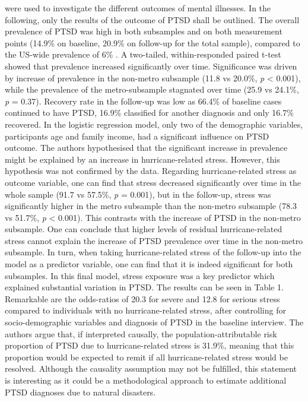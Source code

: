 \documentclass[
]{krantz}
\begin{document}
were used to investigate the different outcomes of mental illnesses. In the following, only the results of the outcome of PTSD shall be outlined.
The overall prevalence of PTSD was high in both subsamples and on both measurement points (14.9\% on baseline, 20.9\% on follow-up for the total sample), compared to the US-wide prevalence of 6\% \citep{goldsteinEpidemiologyDSM5Posttraumatic2016}. A two-tailed, within-responded paired t-test showed that prevalence increased significantly over time. Significance was driven by increase of prevalence in the non-metro subsample (11.8 vs 20.0\%, \emph{p} \textless{} 0.001), while the prevalence of the metro-subsample stagnated over time (25.9 vs 24.1\%, \emph{p} = 0.37). Recovery rate in the follow-up was low as 66.4\% of baseline cases continued to have PTSD, 16.9\% classified for another diagnosis and only 16.7\% recovered. In the logistic regression model, only two of the demographic variables, participants age and family income, had a significant influence on PTSD outcome.
The authors hypothesised that the significant increase in prevalence might be explained by an increase in hurricane-related stress. However, this hypothesis was not confirmed by the data. Regarding hurricane-related stress as outcome variable, one can find that stress decreased significantly over time in the whole sample (91.7 vs 57.5\%, \emph{p} = 0.001), but in the follow-up, stress was significantly higher in the metro subsample than the non-metro subsample (78.3 vs 51.7\%, \emph{p} \textless{} 0.001). This contrasts with the increase of PTSD in the non-metro subsample. One can conclude that higher levels of residual hurricane-related stress cannot explain the increase of PTSD prevalence over time in the non-metro subsample. In turn, when taking hurricane-related stress of the follow-up into the model as a predictor variable, one can find that it is indeed significant for both subsamples. In this final model, stress exposure was a key predictor which explained substantial variation in PTSD. The results can be seen in Table 1. Remarkable are the odds-ratios of 20.3 for severe and 12.8 for serious stress compared to individuals with no hurricane-related stress, after controlling for socio-demographic variables and diagnosis of PTSD in the baseline interview. The authors argue that, if interpreted causally, the population-attributable risk proportion of PTSD due to hurricane-related stress is 31.9\%, meaning that this proportion would be expected to remit if all hurricane-related stress would be resolved. Although the causality assumption may not be fulfilled, this statement is interesting as it could be a methodological approach to estimate additional PTSD diagnoses due to natural disasters.
\end{document}
